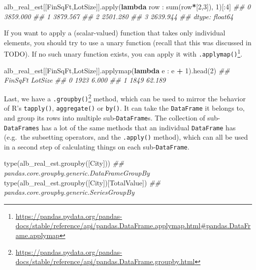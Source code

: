 \documentclass[
  12pt,
  krantz2]{krantz}
\makeatletter
\newenvironment{Shaded}{\begin{snugshade}}{\end{snugshade}}
\newcommand{\BuiltInTok}[1]{#1}
\newcommand{\CommentTok}[1]{\textcolor[rgb]{0.37,0.37,0.37}{\textit{#1}}}
\newcommand{\DecValTok}[1]{\textcolor[rgb]{0.06,0.06,0.06}{#1}}
\newcommand{\KeywordTok}[1]{\textcolor[rgb]{0.27,0.27,0.27}{\textbf{#1}}}
\newcommand{\NormalTok}[1]{#1}
\newcommand{\OperatorTok}[1]{\textcolor[rgb]{0.43,0.43,0.43}{\textbf{#1}}}
\newcommand{\StringTok}[1]{\textcolor[rgb]{0.5,0.5,0.5}{#1}}
\renewcommand{\href}[2]{#2\footnote{\url{#1}}}
\newenvironment{kframe}{%
\medskip{}
\setlength{\fboxsep}{.8em}
 \def\at@end@of@kframe{}%
 \ifinner\ifhmode%
  \def\at@end@of@kframe{\end{minipage}}%
  \begin{minipage}{\columnwidth}%
 \fi\fi%
 \def\FrameCommand##1{\hskip\@totalleftmargin \hskip-\fboxsep
 \colorbox{shadecolor}{##1}\hskip-\fboxsep
     \hskip-\linewidth \hskip-\@totalleftmargin \hskip\columnwidth}%
 \MakeFramed {\advance\hsize-\width
   \@totalleftmargin\z@ \linewidth\hsize
   \@setminipage}}%
 {\par\unskip\endMakeFramed%
 \at@end@of@kframe}
\renewenvironment{Shaded}{\begin{kframe}}{\end{kframe}}
\makeatother
\begin{document}
\begin{Shaded}
\begin{Highlighting}[]
\NormalTok{alb\_real\_est[[}\StringTok{\textquotesingle{}FinSqFt\textquotesingle{}}\NormalTok{,}\StringTok{\textquotesingle{}LotSize\textquotesingle{}}\NormalTok{]].}\BuiltInTok{apply}\NormalTok{(}\KeywordTok{lambda}\NormalTok{ row : }\BuiltInTok{sum}\NormalTok{(row}\OperatorTok{*}\NormalTok{[}\DecValTok{2}\NormalTok{,}\DecValTok{3}\NormalTok{]), }\DecValTok{1}\NormalTok{)[:}\DecValTok{4}\NormalTok{]}
\CommentTok{\#\# 0    3859.000}
\CommentTok{\#\# 1    3879.567}
\CommentTok{\#\# 2    2501.280}
\CommentTok{\#\# 3    2639.944}
\CommentTok{\#\# dtype: float64}
\end{Highlighting}
\end{Shaded}

If you want to apply a (scalar-valued) function that takes only individual elements, you should try to use a unary function (recall that this was discussed in TODO). If no such unary function exists, you can apply it with \href{https://pandas.pydata.org/pandas-docs/stable/reference/api/pandas.DataFrame.applymap.html\#pandas.DataFrame.applymap}{\texttt{.applymap()}}.

\begin{Shaded}
\begin{Highlighting}[]
\NormalTok{alb\_real\_est[[}\StringTok{\textquotesingle{}FinSqFt\textquotesingle{}}\NormalTok{,}\StringTok{\textquotesingle{}LotSize\textquotesingle{}}\NormalTok{]].applymap(}\KeywordTok{lambda}\NormalTok{ e : e }\OperatorTok{+} \DecValTok{1}\NormalTok{).head(}\DecValTok{2}\NormalTok{)}
\CommentTok{\#\#    FinSqFt  LotSize}
\CommentTok{\#\# 0     1923    6.000}
\CommentTok{\#\# 1     1849   62.189}
\end{Highlighting}
\end{Shaded}

Last, we have a \href{https://pandas.pydata.org/pandas-docs/stable/reference/api/pandas.DataFrame.groupby.html}{\texttt{.groupby()}} method, which can be used to mirror the behavior of R's \texttt{tapply()}, \texttt{aggregate()} or \texttt{by()}. It can take the \texttt{DataFrame} it belongs to, and group its rows into multiple sub-\texttt{DataFrame}s. The collection of sub-\texttt{DataFrames} has a lot of the same methods that an individual \texttt{DataFrame} has (e.g.~the subsetting operators, and the \texttt{.apply()} method), which can all be used in a second step of calculating things on each sub-\texttt{DataFrame}.

\begin{Shaded}
\begin{Highlighting}[]
\BuiltInTok{type}\NormalTok{(alb\_real\_est.groupby([}\StringTok{\textquotesingle{}City\textquotesingle{}}\NormalTok{]))}
\CommentTok{\#\# pandas.core.groupby.generic.DataFrameGroupBy}
\BuiltInTok{type}\NormalTok{(alb\_real\_est.groupby([}\StringTok{\textquotesingle{}City\textquotesingle{}}\NormalTok{])[}\StringTok{\textquotesingle{}TotalValue\textquotesingle{}}\NormalTok{])}
\CommentTok{\#\# pandas.core.groupby.generic.SeriesGroupBy}
\end{Highlighting}
\end{Shaded}
\end{document}
